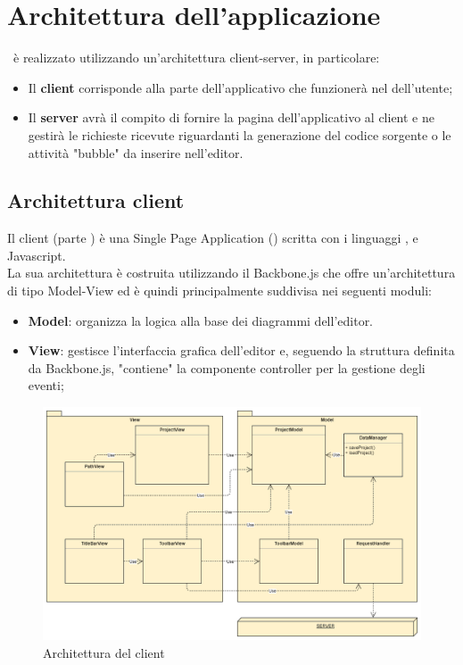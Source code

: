 \documentclass[../DefinizioneDiProdotto.tex]{subfiles}
\begin{document}
		\section{Architettura dell'applicazione}
			\progetto\ è realizzato utilizzando un'architettura client-server, in particolare:
			\begin{itemize}
				\item Il \textbf{client} corrisponde alla parte dell'applicativo che funzionerà nel
				 dell'utente;
				\item Il \textbf{server} avrà il compito di fornire la pagina dell'applicativo al client
				e ne gestirà le richieste ricevute riguardanti la generazione del codice sorgente o le
				attività "bubble" da inserire nell'editor.
			\end{itemize}
			\subsection{Architettura client}
				Il client (parte ) è una Single Page Application () scritta con i linguaggi
				,  e Javascript.\\
				La sua architettura è costruita utilizzando il  Backbone.js che offre
				un'architettura di tipo Model-View ed è quindi principalmente suddivisa nei seguenti moduli:
				\begin{itemize}
					\item \textbf{Model}: organizza la logica alla base dei diagrammi dell'editor.
					\item \textbf{View}: gestisce l'interfaccia grafica dell'editor e, seguendo la struttura
					definita da Backbone.js, "contiene" la componente controller per la gestione
					degli eventi; 
				\end{itemize}
				\begin{figure}[H]\label{fig:ClientSubsystem}
					\centering
					\includegraphics[scale=0.46]{Immagini/DiagrammaArchitettura/ClientSubsystem.png}
					\caption{Architettura del client}
				\end{figure}
\end{document}
